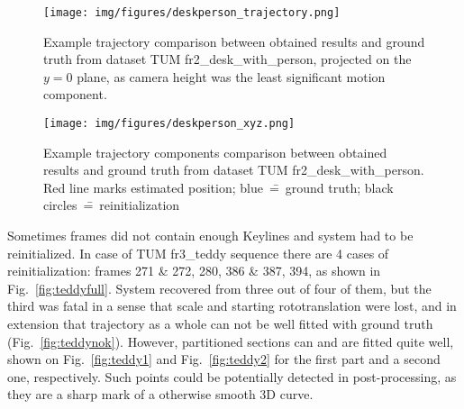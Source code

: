 \begin{figure}[ht]
	\centering\texttt{[image: img/figures/deskperson\_trajectory.png]}
	\caption{ Example trajectory comparison between obtained results and ground truth from dataset TUM fr2\_desk\_with\_person, projected on the $y=0$ plane, as camera height was the least significant motion component. }
	\label{fig:traject}
\end{figure}

\begin{figure}[ht]
	\centering\texttt{[image: img/figures/deskperson\_xyz.png]}
	\caption{ Example trajectory components comparison between obtained results and ground truth from dataset TUM fr2\_desk\_with\_person. Red line marks estimated position; blue~\==~ground truth; black circles~\==~reinitialization }
	\label{fig:trajectxyz}
\end{figure}

Sometimes frames did not contain enough Keylines and system had to be reinitialized. In case of TUM fr3\_teddy sequence there are 4 cases of reinitialization: frames 271 \& 272, 280, 386 \& 387, 394, as shown in Fig.~\ref{fig:teddyfull}. System recovered from three out of four of them, but the third was fatal in a sense that scale and starting rototranslation were lost, and in extension that trajectory as a whole can not be well fitted with ground truth (Fig.~\ref{fig:teddynok}). However, partitioned sections can and are fitted quite well, shown on Fig.~\ref{fig:teddy1} and Fig.~\ref{fig:teddy2} for the first part and a second one, respectively. Such points could be potentially detected in post-processing, as they are a sharp mark of a otherwise smooth 3D curve.

